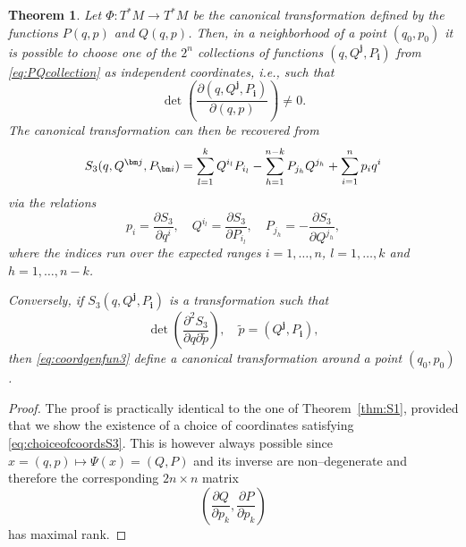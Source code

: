 \documentclass[english,fontsize=11pt,paper=a5,oneside]{scrbook}
\let\d\relax
\newcommand{\d}{\mathrm{d}}
\newtheorem{theorem}{Theorem}[chapter]
\theoremstyle{definition}
\begin{document}
\begin{theorem}
  Let $\Phi:T^*M \to T^* M$ be the canonical transformation defined by the functions $P(q,p)$ and $Q(q,p)$.
  Then, in a neighborhood of a point $(q_0, p_0)$ it is possible to choose one of the $2^n$ collections of functions $(q, Q^{\bm j}, P_{\bm i})$ from \eqref{eq:PQcollection} as independent coordinates, i.e., such that
  \begin{equation}\label{eq:choiceofcoordsS3}
    \det\left(\frac{\partial (q, Q^{\bm j}, P_{\bm i})}{\partial(q,p)}\right) \neq 0.
  \end{equation}
  The canonical transformation can then be recovered from
  \begin{equation}
    \d S_3(q, Q^{\bm j}, P_{\bm i}) = \sum_{l=1}^k Q^{i_l} \d P_{i_l} -\sum_{h=1}^{n-k} P_{j_h} \d Q^{j_h} + \sum_{i=1}^n p_i \d q^i
  \end{equation}
  via the relations
  \begin{equation}\label{eq:coordgenfun3}
    p_i = \frac{\partial S_3}{\partial q^i}, \quad
    Q^{i_l} = \frac{\partial S_3}{\partial P_{i_l}}, \quad
    P_{j_h} = -\frac{\partial S_3}{\partial Q^{j_h}},
  \end{equation}
  where the indices run over the expected ranges $i=1,\ldots,n$, $l=1,\ldots,k$ and $h = 1,\ldots,n-k$.

  Conversely, if $S_3(q, Q^{\bm j}, P_{\bm i})$ is a transformation such that
  \begin{equation}
    \det\left(\frac{\partial^2 S_3}{\partial q \partial \widetilde p}\right), \quad \widetilde p = (Q^{\bm j}, P_{\bm i}),
  \end{equation}
  then \eqref{eq:coordgenfun3} define a canonical transformation around a point $(q_0, p_0)$.
\end{theorem}

\begin{proof}
  The proof is practically identical to the one of Theorem~\ref{thm:S1}, provided that we show the existence of a choice of coordinates satisfying \eqref{eq:choiceofcoordsS3}.
  This is however always possible since $x=(q,p) \mapsto \Psi(x) = (Q,P)$ and its inverse are non--degenerate and therefore the corresponding $2n\times n$ matrix
  \begin{equation}
    \left(\frac{\partial Q}{\partial p_k}, \frac{\partial P}{\partial p_k}\right)
  \end{equation}
  has maximal rank.
\end{proof}
\end{document}
